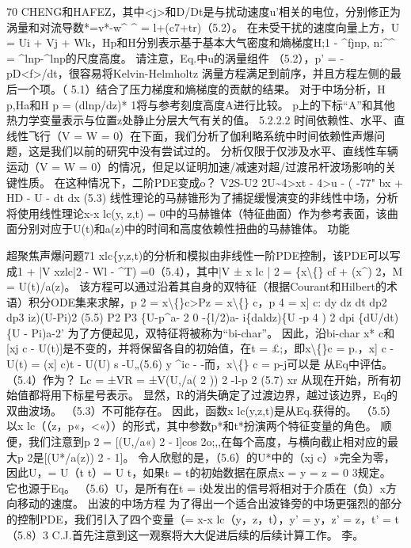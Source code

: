 \documentclass[UTF8,11pt,a4paper,openany,fontset=fandol]{ctexbook}
\begin{document}
70 CHENG和HAFEZ，其中<j>和D/Dt是与扰动速度u'相关的电位，分别修正为涡量和对流导数*=v*-w\textasciicircum{} \textasciicircum{} = l+(c7+tr)（5.2）。 在未受干扰的速度向量上方，U = Ui + Vj + Wk，Hp和H分别表示基于基本大气密度和熵梯度H;1 - \textasciicircum{}fjnp, n:\textasciicircum{}\textasciicircum{} = \textasciicircum{}lnp-\textasciicircum{}lnp的尺度高度。 请注意，Eq.中u的涡量组件 （5.2），p' = -pD<f>/dt，很容易将Kelvin-Helmholtz 涡量方程满足到前序，并且方程左侧的最后一个项。（ 5.1）结合了压力梯度和熵梯度的贡献的结果。 对于中场分析，H p,Ha和H p = (dlnp/dz)* 1将与参考刻度高度A进行比较。 p上的下标“A”和其他热力学变量表示与位置z处静止分层大气有关的值。 5.2.2.2 时间依赖性、水平、直线性飞行（V = W = 0）在下面，我们分析了伽利略系统中时间依赖性声爆问题，这是我们以前的研究中没有尝试过的。 分析仅限于仅涉及水平、直线性车辆运动（V = W = 0）的情况，但足以证明加速/减速对超/过渡吊杆波场影响的关键性质。 在这种情况下，二阶PDE变成o？ V2S-U2 2U\textasciitilde{}4>xt - 4>u - ( -77" bx + HD - U - dt dx (5.3) 线性理论的马赫锥形为了捕捉缓慢演变的非线性中场，分析将使用线性理论x-x lc(y, z,t) = 0中的马赫锥体（特征曲面）作为参考表面，该曲面分别对应于U(t)和a(z)中的时间和高度依赖性扭曲的马赫锥体。 功能

超聚焦声爆问题71 xlc\{y,z,t)的分析和模拟由非线性一阶PDE控制，该PDE可以写成1 + |V xzlc|2 - Wl - \textasciicircum{}T) =0（5.4），其中|V ± x lc | 2 = \{x\textbackslash\{\} cf + (x\textasciicircum{}) 2，M = U(t)/a(z)。 该方程可以通过沿着其自身的双特征（根据Courant和Hilbert的术语）积分ODE集来求解，p 2 = x\textbackslash\{\}c>Pz = x\textbackslash\{\} c，p 4 = x] c: dy dz dt dp2 dp3 iz)(U-Pi)2 (5.5) P2 P3 \{U-p\textasciicircum{}a- 2 0 -\{l/2)a- i\{daldz)\{U -p 4 ) 2 dpi \{dU/dt)\{U - Pi)a-2' 为了方便起见，双特征将被称为“bi-char”。 因此，沿bi-char x* c和[xj c - U(t)]是不变的，并将保留各自的初始值，在t = £;，即x\textbackslash\{\}c = p.，x] c - U(t) = (x] c)t - U(U) s -U„(5.6) y \textasciicircum{}ic - -而，x\textbackslash\{\} c = p-j可以是 从Eq中评估。 （5.4）作为？ Lc = ±VR = ±V(U,/a( 2 )) 2 -l-p 2 (5.7) xr 从现在开始，所有初始值都将用下标星号表示。 显然，R的消失确定了过渡边界，越过该边界，Eq的双曲波场。 （5.3）不可能存在。 因此，函数x lc(y,z,t)是从Eq.获得的。 （5.5）以x lc（（z，p«，<«））的形式，其中参数p*和t*扮演两个特征变量的角色。 顺便，我们注意到p 2 = [(U,/a«) 2 - l]cos 2o;,,在每个高度，与横向截止相对应的最大p 2是[(U*/a(z)) 2 - 1]。 令人欣慰的是，（5.6）的U*中的（xj c）»完全为零，因此U，= U（t t）= U t，如果t = t的初始数据在原点x = y = z = 0 3规定。 它也源于Eq。 （5.6）U，是所有在t = i处发出的信号将相对于介质在（负）x方向移动的速度。 出波的中场方程 为了得出一个适合出波锋旁的中场更强烈的部分的控制PDE，我们引入了四个变量（= x-x lc（y，z，t），y' = y，z' = z，t' = t（5.8）3 C.J.首先注意到这一观察将大大促进后续的后续计算工作。 李。
\end{document}
